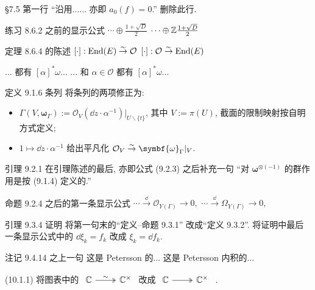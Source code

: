 \documentclass{AJerrata}
\newcommand{\bomega}{\symbf{\omega}}	%
\begin{document}
\begin{Errata}
		\item[\S 7.5 第一行 ``沿用...... 亦即 $a_0(f)=0$.'']
		删除此行.
		
		\item[练习 8.6.2 之前的显示公式]
		\Orig $\cdots \oplus \frac{1 + \sqrt{D}}{2}$
		\Corr $\cdots \oplus \mathbb{Z} \frac{1 + \sqrt{D}}{2}$
		
		\item[定理 8.6.4 的陈述]
		\Orig $[\cdot]: \operatorname{End}(E) \stackrel{\sim}{\rightarrow} \mathcal{O}$
		\Corr $[\cdot]: \mathcal{O} \stackrel{\sim}{\rightarrow} \operatorname{End}(E)$
		
		\Orig ... 都有 $[\alpha]^* \omega$...
		\Corr ... 和 $\alpha \in \mathcal{O}$ 都有 $[\alpha]^* \omega$...
		
		\item[定义 9.1.6 条列]
		将条列的两项修正为:
		\begin{itemize}
			\item $\Gamma(V, \bomega_\Gamma) := \mathcal{O}_V (\dd z \cdot \alpha^{-1}) |_{U \smallsetminus \{t\}}$, 其中 $V := \pi(U)$, 截面的限制映射按自明方式定义;
			\item $1 \mapsto \dd z \cdot \alpha^{-1}$ 给出平凡化 $\mathcal{O}_V \rightiso \bomega_\Gamma |_V$.
		\end{itemize}
		
		\item[引理 9.2.1]
		在引理陈述的最后, 亦即公式 (9.2.3) 之后补充一句 ``对 $\bomega^{\otimes (-1)}$ 的群作用是按 (9.1.4) 定义的.''

		\item[命题 9.2.4 之后的第一条显示公式]
		\Orig $\cdots \xrightarrow{\dd} \mathcal{O}_{Y(\Gamma)} \to 0,$
		\Corr $\cdots \xrightarrow{\dd} \Omega_{Y(\Gamma)} \to 0,$
		
		\item[引理 9.3.4 证明]
		将第一句末的``定义--命题 9.3.1'' 改成``定义 9.3.2''. 将证明中最后一条显示公式中的 $\dd\xi_k = f_k$ 改成 $\xi_k = \dd f_k$.

		\item[注记 9.4.14 之上一句]
		\Orig 这是 Petersson 的...
		\Corr 这是 Petersson 内积的...
		
		\item[(10.1.1)] 将图表中的
		$\begin{tikzcd} \mathbb{C} \arrow[twoheadrightarrow, r, "\sim"] & \mathbb{C}^\times \end{tikzcd}$
		改成
		$\begin{tikzcd} \mathbb{C} \arrow[twoheadrightarrow, r] & \mathbb{C}^\times \end{tikzcd}$ .


\end{Errata}
\end{document}
